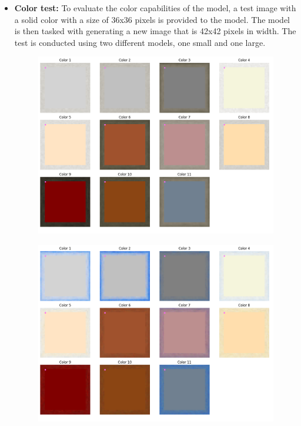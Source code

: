     \begin{itemize}
        \item \textbf{Color test:} To evaluate the color capabilities of the model, a test image with a solid color with a size of 36x36 pixels is provided to the model. The model is then tasked with generating a new image that is 42x42 pixels in width. The test is conducted using two different models, one small and one large.

        \begin{figure}[H]
            \centering
            \begin{minipage}{0.40\textwidth}
                \centering
                \includegraphics[width=\textwidth]{imgs/ColorTest_5.0.1.0_small.png} 
                \label{fig:test0_1_M4_SIT}
            \end{minipage}
            \hspace{0.05\textwidth}
            \begin{minipage}{0.40\textwidth}
                \centering
                \includegraphics[width=\textwidth]{imgs/ColorTest_5.0.1.0_big.png} 

\end{minipage}
\end{figure}
\end{itemize}
